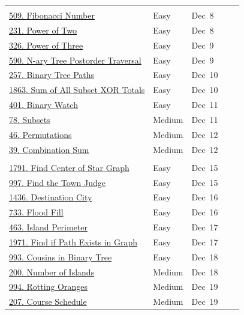 \documentclass{article}
\begin{document}
\begin{longtable}{p{7.5cm} l l c c}
\rowcolor{gray!20} \multicolumn{5}{l}{\textbf{9. Backtracking}} \\
\href{https://leetcode.com/problems/fibonacci-number/}{509. Fibonacci Number} & Easy & Dec~8 & & \\
\href{https://leetcode.com/problems/power-of-two/}{231. Power of Two} & Easy & Dec~8 & & \\
\href{https://leetcode.com/problems/power-of-three/}{326. Power of Three} & Easy & Dec~9 & & \\
\href{https://leetcode.com/problems/n-ary-tree-postorder-traversal/}{590. N-ary Tree Postorder Traversal} & Easy & Dec~9 & & \\
\href{https://leetcode.com/problems/binary-tree-paths/}{257. Binary Tree Paths} & Easy & Dec~10 & & \\
\href{https://leetcode.com/problems/sum-of-all-subset-xor-totals/}{1863. Sum of All Subset XOR Totals} & Easy & Dec~10 & & \\
\href{https://leetcode.com/problems/binary-watch/}{401. Binary Watch} & Easy & Dec~11 & & \\
\href{https://leetcode.com/problems/subsets/}{78. Subsets} & Medium & Dec~11 & & \\
\href{https://leetcode.com/problems/permutations/}{46. Permutations} & Medium & Dec~12 & & \\
\href{https://leetcode.com/problems/combination-sum/}{39. Combination Sum} & Medium & Dec~12 & & \\

\rowcolor{gray!20} \multicolumn{5}{l}{\textbf{10. Graphs}} \\
\href{https://leetcode.com/problems/find-center-of-star-graph/}{1791. Find Center of Star Graph} & Easy & Dec~15 & & \\
\href{https://leetcode.com/problems/find-the-town-judge/}{997. Find the Town Judge} & Easy & Dec~15 & & \\
\href{https://leetcode.com/problems/destination-city/}{1436. Destination City} & Easy & Dec~16 & & \\
\href{https://leetcode.com/problems/flood-fill/}{733. Flood Fill} & Easy & Dec~16 & & \\
\href{https://leetcode.com/problems/island-perimeter/}{463. Island Perimeter} & Easy & Dec~17 & & \\
\href{https://leetcode.com/problems/find-if-path-exists-in-graph/}{1971. Find if Path Exists in Graph} & Easy & Dec~17 & & \\
\href{https://leetcode.com/problems/cousins-in-binary-tree/}{993. Cousins in Binary Tree} & Easy & Dec~18 & & \\
\href{https://leetcode.com/problems/number-of-islands/}{200. Number of Islands} & Medium & Dec~18 & & \\
\href{https://leetcode.com/problems/rotting-oranges/}{994. Rotting Oranges} & Medium & Dec~19 & & \\
\href{https://leetcode.com/problems/course-schedule/}{207. Course Schedule} & Medium & Dec~19 & & \\


\end{longtable}
\end{document}
